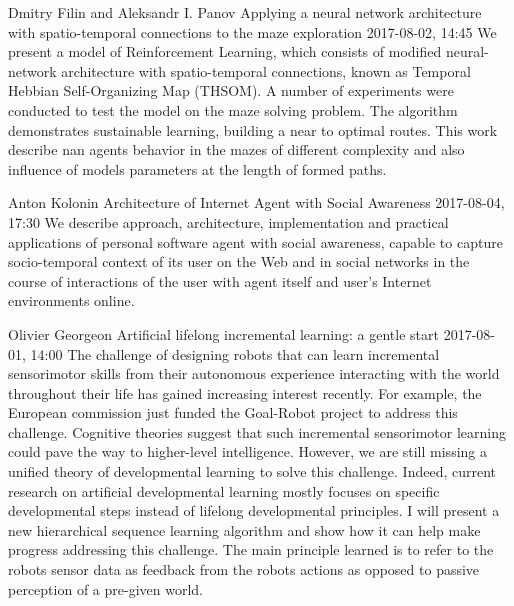 \documentclass[10pt,fleqn,openany]{book} %
\begin{document}
\begin{enumerate}
		
		\paperabstract
		{Dmitry Filin and Aleksandr I. Panov}
		{Applying a neural network architecture with spatio-temporal connections to the maze exploration}
		{2017-08-02, 14:45}
		{We present a model of Reinforcement Learning, which consists of modified neural-network architecture with spatio-temporal connections, known as Temporal Hebbian Self-Organizing Map (THSOM). A number of experiments were conducted to test the model on the maze solving problem. The algorithm demonstrates sustainable learning, building a near to optimal routes. This work describe nan agents behavior in the mazes of different complexity and also influence of models parameters at the length of formed paths.}
		
		
		\paperabstract
		{Anton Kolonin}
		{Architecture of Internet Agent with Social Awareness}
		{2017-08-04, 17:30}
		{We describe approach, architecture, implementation and practical applications of personal software agent with social awareness, capable to capture socio-temporal context of its user on the Web and in social networks in the course of interactions of the user with agent itself and user's Internet environments online.}
		
		
		\paperabstract
		{Olivier Georgeon}
		{Artificial lifelong incremental learning: a gentle start}
		{2017-08-01, 14:00}
		{The challenge of designing robots that can learn incremental sensorimotor skills from their autonomous experience interacting with the world throughout their life has gained increasing interest recently. For example, the European commission just funded the Goal-Robot project to address this challenge. Cognitive theories suggest that such incremental sensorimotor learning could pave the way to higher-level intelligence. However, we are still missing a unified theory of developmental learning to solve this challenge. Indeed, current research on artificial developmental learning mostly focuses on specific developmental steps instead of lifelong developmental principles. I will present a new hierarchical sequence learning algorithm and show how it can help make progress addressing this challenge.  The main principle learned is to refer to the robots sensor data as feedback from the robots actions as opposed to passive perception of a pre-given world.}
		

\end{enumerate}
\end{document}
